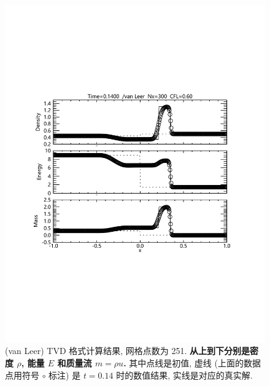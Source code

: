 \documentclass[10.5pt
]{article}
\begin{document}
\begin{figure}
\begin{center}
\includegraphics[width=.85\textwidth]{fig_tvd_1.pdf}
\caption{(van Leer) TVD 格式计算结果, 网格点数为 251. \textbf{从上到下分别是密度 $\rho$, 能量 $E$ 和质量流 $m = \rho u$.}
其中点线是初值, 虚线 (上面的数据点用符号 $\circ$ 标注) 是 $t=0.14$ 时的数值结果, 实线是对应的真实解. }\label{Fig:vanLeerA}
\end{center}
\end{figure}
\end{document}
